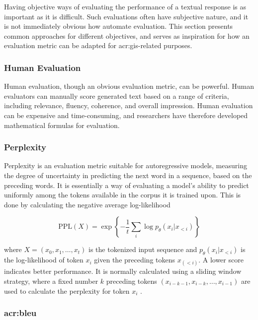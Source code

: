 Having objective ways of evaluating the performance of a textual response is as important as it is difficult. Such evaluations often have subjective nature, and it is not immediately obvious how automate evaluation. This section presents common approaches for different objectives, and serves as inspiration for how an evaluation metric can be adapted for \acrshort{acr:gis}-related purposes.

\subsubsection{Human Evaluation}

Human evaluation, though an obvious evaluation metric, can be powerful. Human evaluators can manually score generated text based on a range of criteria, including relevance, fluency, coherence, and overall impression. Human evaluation can be expensive and time-consuming, and researchers have therefore developed mathematical formulas for evaluation.

\subsubsection{Perplexity}

Perplexity is an evaluation metric suitable for autoregressive models, measuring the degree of uncertainty in predicting the next word in a sequence, based on the preceding words. It is essentially a way of evaluating a model's ability to predict uniformly among the tokens available in the corpus it is trained upon. This is done by calculating the negative average log-likelihood

\begin{equation}
    \text{PPL}(X) = \exp \left\{ -\frac{1}{t} \sum_{i} \log p_\theta(x_i | x_{<i}) \right\}
    \label{eq:ppl}
\end{equation}

\noindent where $X = (x_0, x_1, \ldots, x_t)$ is the tokenized input sequence and $p_\theta(x_i | x_{<i})$ is the log-likelihood of token $x_i$ given the preceding tokens $x_(<i)$. A lower score indicates better performance. It is normally calculated using a sliding window strategy, where a fixed number $k$ preceding tokens $(x_{i-k-1},x_{i-k},\ldots,x_{i-1})$ are used to calculate the perplexity for token $x_i$ \citep{huggingfacePerplexityFixedlengthModels}.

\subsubsection[BiLingual Evaluation Understudy]{\acrfull{acr:bleu}}

